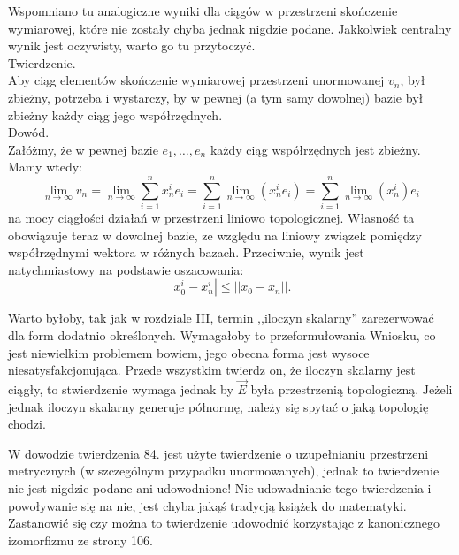 \documentclass[a4paper,11pt]{article}
\begin{document}
\start {} Wspomniano tu analogiczne wyniki dla ciągów w
przestrzeni skończenie wymiarowej, które nie zostały chyba jednak
nigdzie podane. Jakkolwiek centralny wynik jest oczywisty, warto
go tu przytoczyć. \\
Twierdzenie. \\
Aby ciąg elementów skończenie wymiarowej przestrzeni unormowanej
$v_{ n }$, był zbieżny, potrzeba i wystarczy, by w pewnej (a tym samy
dowolnej) bazie był zbieżny każdy ciąg jego
współrzędnych. \\
Dowód. \\
Załóżmy, że w pewnej bazie $e_{ 1 }, \ldots, e_{ n }$ każdy ciąg
współrzędnych jest zbieżny. Mamy wtedy:
\begin{equation*}
  \lim_{ n \to \infty } v_{ n }
  = \lim_{ n \to \infty } \sum_{ i = 1 }^{ n } x_{ n }^{ i } e_{ i }
  = \sum_{ i = 1 }^{ n } \lim_{ n \to \infty }( x_{ n }^{ i } e_{ i } )
  = \sum_{ i = 1 }^{ n } \lim_{ n \to \infty }( x_{ n }^{ i } ) e_{ i }  
\end{equation*}
na mocy ciągłości działań w przestrzeni liniowo topologicznej.
Własność ta obowiązuje teraz w dowolnej bazie, ze względu na liniowy
związek pomiędzy współrzędnymi wektora w różnych bazach. Przeciwnie,
wynik jest natychmiastowy na podstawie oszacowania:
$$| x_{ 0 }^{ i } - x_{ n }^{ i } | \leq || x_{ 0 } - x_{ n } ||\textrm{.}$$

\vspace{\spaceFour}


\start {} Warto byłoby, tak jak w rozdziale III, termin
,,iloczyn skalarny'' zarezerwować dla form dodatnio określonych.
Wymagałoby to przeformułowania Wniosku, co jest niewielkim problemem
bowiem, jego obecna forma jest wysoce niesatysfakcjonująca. Przede
wszystkim twierdz on, że iloczyn skalarny jest ciągły, to stwierdzenie
wymaga jednak by $\vec{ E }$ była przestrzenią topologiczną. Jeżeli
jednak iloczyn skalarny generuje półnormę, należy się spytać o jaką
topologię chodzi.

\vspace{\spaceFour}


\start {} W dowodzie twierdzenia 84. jest użyte twierdzenie o
uzupełnianiu przestrzeni metrycznych (w szczególnym przypadku
unormowanych), jednak to twierdzenie nie jest nigdzie podane ani
udowodnione! Nie udowadnianie tego twierdzenia i powoływanie się na
nie, jest chyba jakąś tradycją książek do matematyki. Zastanowić się
czy można to twierdzenie udowodnić korzystając z kanonicznego
izomorfizmu ze strony 106.
\end{document}

